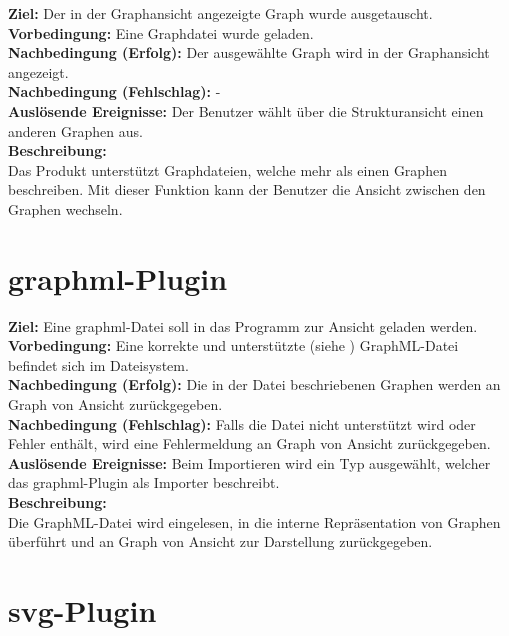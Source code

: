 \label{fa:graphwechsel}
\textbf{Ziel:} Der in der Graphansicht angezeigte Graph wurde ausgetauscht. \\
\textbf{Vorbedingung:} Eine Graphdatei wurde geladen.\\
\textbf{Nachbedingung (Erfolg):} Der ausgewählte Graph wird in der Graphansicht angezeigt.\\
\textbf{Nachbedingung (Fehlschlag):} -\\
\textbf{Auslösende Ereignisse:}
Der Benutzer wählt über die Strukturansicht einen anderen Graphen aus.\\
\textbf{Beschreibung:}\\
Das Produkt unterstützt Graphdateien, welche mehr als einen Graphen beschreiben.
Mit dieser Funktion kann der Benutzer die Ansicht zwischen den Graphen wechseln.


\label{fa:speichern}
\label{fa:laden}
\label{fa:laden}

\section{\gls{graphml}-Plugin}
\setcounter{fanr}{300}

\label{fa:importgraphml}
\textbf{Ziel:} Eine \gls{graphml}-Datei soll in das Programm zur Ansicht geladen werden.\\
\textbf{Vorbedingung:} Eine korrekte und unterstützte (siehe ) GraphML-Datei befindet sich im Dateisystem.\\
\textbf{Nachbedingung (Erfolg):} Die in der Datei beschriebenen Graphen werden an Graph von Ansicht zurückgegeben.\\
\textbf{Nachbedingung (Fehlschlag):} Falls die Datei nicht unterstützt wird oder Fehler enthält, wird eine Fehlermeldung an Graph von Ansicht zurückgegeben.\\
\textbf{Auslösende Ereignisse:} Beim Importieren wird ein Typ ausgewählt, welcher das \gls{graphml}-Plugin als Importer beschreibt.\\
\textbf{Beschreibung:}\\
Die GraphML-Datei wird eingelesen, in die interne Repräsentation von Graphen überführt und an Graph von Ansicht zur Darstellung zurückgegeben.

\section{\gls{svg}-Plugin}
\setcounter{fanr}{400}

